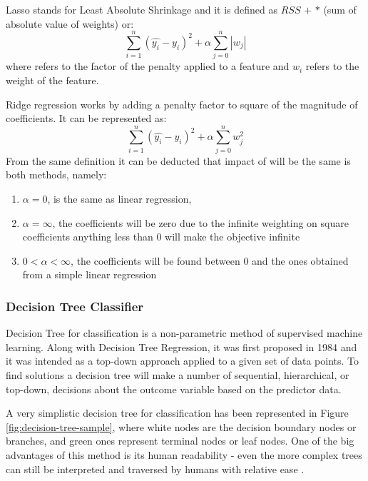 Lasso stands for Least Absolute Shrinkage and it is defined as $RSS$ $+$ \textalpha{} $*$ (sum of absolute value of weights) or:
\begin{equation}\label{eq_lasso}
\sum^n_{i=1}(\hat{y_i}- y_i)^2 + \alpha \sum^n_{j=0}|w_j|
\end{equation}
where \textalpha{} refers to the factor of the penalty applied to a feature and $w_i$ refers to the weight of the feature\cite{Hastie2009SpringerOfLasso}.

Ridge regression works by adding a penalty factor to square of the magnitude of coefficients\cite{Hastie2009SpringerOfRidge}. It can be represented as:
\begin{equation}\label{eq_ridge}
\sum^n_{i=1}(\hat{y_i}- y_i)^2 + \alpha \sum^n_{j=0}w_j^2
\end{equation}
From the same definition it can be deducted that impact of \textalpha{} will be the same is both methods, namely:
\begin{enumerate}\label{list:impact-of-alpha}
\itemsep0em
\item\label{it:item1} $\alpha = 0$, is the same as linear regression, 
\item\label{it:item2} $\alpha = \infty$, the coefficients will be zero due to the infinite weighting on square coefficients anything less than 0 will make the objective infinite
\item\label{it:item3} $0 < \alpha < \infty$, the coefficients will be found between 0 and the ones obtained from a simple linear regression
\end{enumerate}

\subsubsection{Decision Tree Classifier}
Decision Tree for classification is a non-parametric method of supervised machine learning. Along with Decision Tree Regression, it was first proposed in 1984\cite{BreimanCart1984} and it was intended as a top-down approach applied to a given set of data points. To find solutions a decision tree will make a number of sequential, hierarchical, or top-down, decisions about the outcome variable based on the predictor data. 

A very simplistic decision tree for classification has been represented in Figure \ref{fig:decision-tree-sample}, where white nodes are the decision boundary nodes or branches, and green ones represent terminal nodes or leaf nodes. One of the big advantages of this method is its human readability - even the more complex trees can still be interpreted and traversed by humans with relative ease . 

